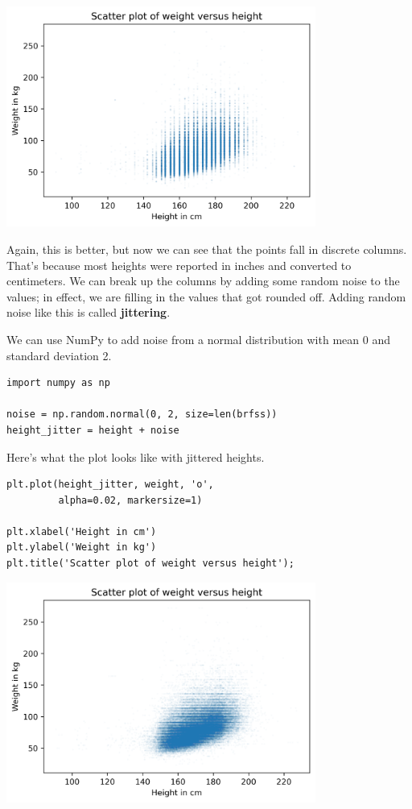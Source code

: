 \begin{center}
\includegraphics[width=4in]{09_relationships_files/09_relationships_17_0.png}
\end{center}

Again, this is better, but now we can see that the points fall in
discrete columns. That's because most heights were reported in inches
and converted to centimeters. We can break up the columns by adding some
random noise to the values; in effect, we are filling in the values that
got rounded off. Adding random noise like this is called
\textbf{jittering}.

We can use NumPy to add noise from a normal distribution with mean 0 and
standard deviation 2.

\begin{lstlisting}[]
import numpy as np

noise = np.random.normal(0, 2, size=len(brfss))
height_jitter = height + noise
\end{lstlisting}

Here's what the plot looks like with jittered heights.

\begin{lstlisting}[]
plt.plot(height_jitter, weight, 'o', 
         alpha=0.02, markersize=1)

plt.xlabel('Height in cm')
plt.ylabel('Weight in kg')
plt.title('Scatter plot of weight versus height');
\end{lstlisting}

\begin{center}
\includegraphics[width=4in]{09_relationships_files/09_relationships_21_0.png}
\end{center}


